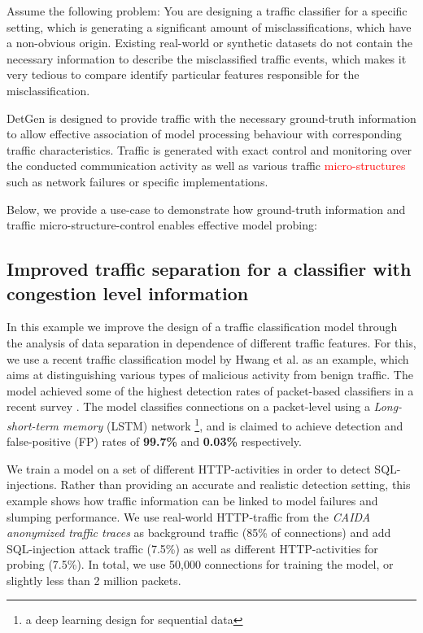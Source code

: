 \documentclass[runningheads]{llncs}
\begin{document}
Assume the following problem: You are designing a traffic classifier for a specific setting, which is generating a significant amount of misclassifications, which have a non-obvious origin. Existing real-world or synthetic datasets do not contain the necessary information to describe the misclassified traffic events, which makes it very tedious to compare identify particular features responsible for the misclassification. 

DetGen is designed to provide traffic with the necessary ground-truth information to allow effective association of model processing behaviour with corresponding traffic characteristics. Traffic is generated with exact control and monitoring over the conducted communication activity as well as various traffic \textcolor{red}{micro-structures} such as network failures or specific implementations.

Below, we provide a use-case to demonstrate how ground-truth information and traffic micro-structure-control enables effective model probing:

\subsection{Improved traffic separation for a classifier with congestion level information}\label{Sec:Improvedtrafficsep}


In this example we improve the design of a traffic classification model through the analysis of data separation in dependence of different traffic features. For this, we use a recent traffic classification model by Hwang et al. \cite{hwang2019lstm} as an example, which aims at distinguishing various types of malicious activity from benign traffic. The model achieved some of the highest detection rates of packet-based classifiers in a recent survey \cite{tahaei2020rise}.
The model classifies connections on a packet-level using a \textit{Long-short-term memory} (LSTM) network \footnote{a deep learning design for sequential data}, and is claimed to achieve detection and false-positive (FP) rates of \textbf{99.7\%} and \textbf{0.03\%} respectively. 


We train a model on a set of different HTTP-activities in order to detect SQL-injections. Rather than providing an accurate and realistic detection setting, this example shows how traffic information can be linked to model failures and slumping performance. We use real-world HTTP-traffic from the \textit{CAIDA anonymized traffic traces} \cite{walsworth2015caida} as background traffic (85\% of connections) and add SQL-injection attack traffic (7.5\%) as well as different HTTP-activities for probing (7.5\%). In total, we use 50,000 connections for training the model, or slightly less than 2 million packets. 
\end{document}

